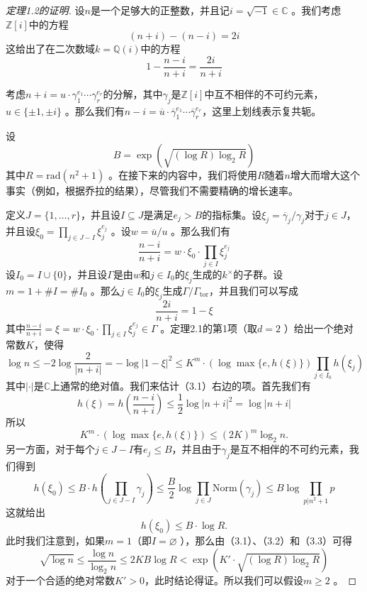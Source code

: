 \documentclass{article}
\begin{document}
\begin{proof}[定理1.2的证明]
设\(n\)是一个足够大的正整数，并且记\(i = \sqrt{-1} \in \mathbb{C}\) 。我们考虑\(\mathbb{Z}[i]\)中的方程
\[
(n + i)-(n - i)=2i
\]
这给出了在二次数域\(k = \mathbb{Q}(i)\)中的方程
\[
1-\frac{n - i}{n + i}=\frac{2i}{n + i}
\]

考虑\(n + i = u \cdot \gamma_{1}^{e_{1}} \cdots \gamma_{r}^{e_{r}}\)的分解，其中\(\gamma_{j}\)是\(\mathbb{Z}[i]\)中互不相伴的不可约元素，\(u \in \{ \pm 1, \pm i\}\) 。那么我们有\(n - i=\overline{u} \cdot \overline{\gamma}_{1}^{e_{1}} \cdots \overline{\gamma}_{r}^{e_{r}}\)，这里上划线表示复共轭。

设
\[
B=\exp \left(\sqrt{(\log R) \log _{2} R}\right)
\]
其中\(R=\text{rad}(n^{2}+1)\) 。在接下来的内容中，我们将使用\(R\)随着\(n\)增大而增大这个事实（例如，根据乔拉的结果），尽管我们不需要精确的增长速率。

定义\(J = \{1, \ldots, r\}\)，并且设\(I \subseteq J\)是满足\(e_{j}>B\)的指标集。设\(\xi_{j}=\overline{\gamma}_{j} / \gamma_{j}\)对于\(j \in J\)，并且设\(\xi_{0}=\prod_{j \in J - I} \xi_{j}^{e_{j}}\) 。设\(w=\overline{u} / u\) 。那么我们有
\[
\frac{n - i}{n + i}=w \cdot \xi_{0} \cdot \prod_{j \in I} \xi_{j}^{e_{j}}
\]
设\(I_{0}=I \cup \{0\}\)，并且设\(\Gamma\)是由\(w\)和\(j \in I_{0}\)的\(\xi_{j}\)生成的\(k^{\times}\)的子群。设\(m = 1+\#I=\#I_{0}\) 。那么\(j \in I_{0}\)的\(\xi_{j}\)生成\(\Gamma / \Gamma_{\text{tor}}\)，并且我们可以写成
\[
\frac{2i}{n + i}=1-\xi
\]
其中\(\frac{n - i}{n + i}=\xi=w \cdot \xi_{0} \cdot \prod_{j \in I} \xi_{j}^{e_{j}} \in \Gamma\) 。定理2.1的第1项（取\(d = 2\) ）给出一个绝对常数\(K\)，使得
\[
\log n \leq -2 \log \frac{2}{|n + i|}=-\log |1-\xi|^{2} \leq K^{m} \cdot (\log \max \{e, h(\xi)\}) \prod_{j \in I_{0}} h(\xi_{j}) \tag{3.1}
\]
其中\(|\cdot|\)是\(\mathbb{C}\)上通常的绝对值。我们来估计（3.1）右边的项。首先我们有
\[
h(\xi)=h\left(\frac{n - i}{n + i}\right) \leq \frac{1}{2} \log |n + i|^{2}=\log |n + i|
\]
所以
\[
K^{m} \cdot (\log \max \{e, h(\xi)\}) \leq (2K)^{m} \log _{2} n. \tag{3.2}
\]
另一方面，对于每个\(j \in J - I\)有\(e_{j} \leq B\)，并且由于\(\gamma_{j}\)是互不相伴的不可约元素，我们得到
\[
h(\xi_{0}) \leq B \cdot h\left(\prod_{j \in J - I} \gamma_{j}\right) \leq \frac{B}{2} \log \prod_{j \in J} \text{Norm}(\gamma_{j}) \leq B \log \prod_{p | n^{2}+1} p
\]
这就给出
\[
h(\xi_{0}) \leq B \cdot \log R. \tag{3.3}
\]
此时我们注意到，如果\(m = 1\)（即\(I = \varnothing\) ），那么由（3.1）、（3.2）和（3.3）可得
\[
\sqrt{\log n} \leq \frac{\log n}{\log _{2} n} \leq 2K B \log R<\exp \left(K' \cdot \sqrt{(\log R) \log _{2} R}\right)
\]
对于一个合适的绝对常数\(K'>0\)，此时结论得证。所以我们可以假设\(m \geq 2\) 。


\end{proof}
\end{document}
